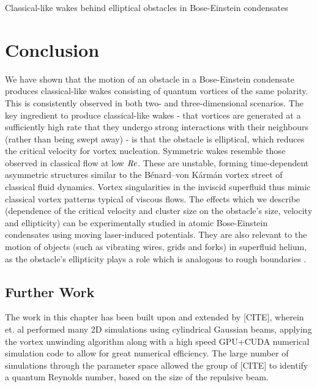 \begin{chapter}{\label{cha:wake}Classical-like wakes behind elliptical obstacles in Bose-Einstein condensates}
\section{Conclusion}
We have shown that the motion of an obstacle in a Bose-Einstein condensate produces classical-like wakes consisting of quantum vortices of the same polarity.  This is consistently observed in both two- and three-dimensional scenarios.  The key ingredient to produce classical-like wakes - that vortices are generated at a sufficiently high rate that they undergo strong interactions with their neighbours  (rather than being swept away) - is that the obstacle is elliptical, which reduces the critical velocity for vortex nucleation.  Symmetric wakes resemble those observed in classical flow at low $\mbox{\ensuremath{\mathit{Re}}}$.  These are unstable, forming time-dependent asymmetric structures similar to the B\'enard--von K\'arm\'an vortex street of classical fluid dynamics. Vortex singularities
in the inviscid superfluid thus mimic classical vortex patterns typical of viscous flows.  The effects which we describe (dependence of the critical velocity and cluster size on the obstacle's size, velocity and ellipticity) can be experimentally studied in atomic Bose-Einstein condensates using moving laser-induced potentials. They are also relevant to the motion of objects (such as vibrating wires, grids and forks) in superfluid helium, as the obstacle's ellipticity plays a role which is analogous to rough boundaries \cite{blaz08,brad05}. 


\subsection{Further Work}
The work in this chapter has been built upon and extended by [CITE], wherein et. al performed many 2D simulations using cylindrical Gaussian beams, applying the vortex unwinding algorithm along with a high speed GPU+CUDA numerical simulation code to allow for great numerical efficiency. The large number of simulations through the parameter space allowed the group of [CITE] to identify a quantum Reynolds number, based on the size of the repulsive beam.
\end{chapter}

